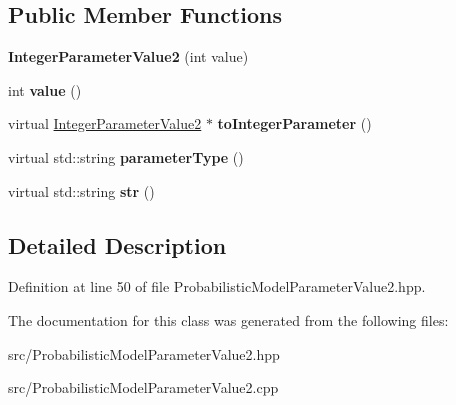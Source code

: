 \subsection*{Public Member Functions}
\begin{DoxyCompactItemize}
\item 
\mbox{\label{classtops_1_1IntegerParameterValue2_a0a264cc43a74695d0ba77c6416b6e157}} 
{\bfseries Integer\+Parameter\+Value2} (int value)
\item 
\mbox{\label{classtops_1_1IntegerParameterValue2_aaec8aff937cca706bfae4892686f4cad}} 
int {\bfseries value} ()
\item 
\mbox{\label{classtops_1_1IntegerParameterValue2_a129db451790107543ad99579908a182b}} 
virtual \hyperlink{classtops_1_1IntegerParameterValue2}{Integer\+Parameter\+Value2} $\ast$ {\bfseries to\+Integer\+Parameter} ()
\item 
\mbox{\label{classtops_1_1IntegerParameterValue2_ac5e002145b48bfd6eb7427f55cb4541d}} 
virtual std\+::string {\bfseries parameter\+Type} ()
\item 
\mbox{\label{classtops_1_1IntegerParameterValue2_a8c1d1a6464ddfce151a2a54e9a649162}} 
virtual std\+::string {\bfseries str} ()
\end{DoxyCompactItemize}


\subsection{Detailed Description}


Definition at line 50 of file Probabilistic\+Model\+Parameter\+Value2.\+hpp.



The documentation for this class was generated from the following files\+:\begin{DoxyCompactItemize}
\item 
src/Probabilistic\+Model\+Parameter\+Value2.\+hpp\item 
src/Probabilistic\+Model\+Parameter\+Value2.\+cpp\end{DoxyCompactItemize}
